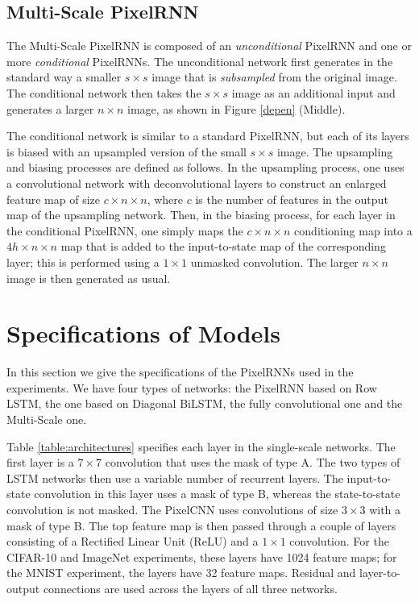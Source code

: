 \subsection{Multi-Scale PixelRNN}
\label{sect:multiscale}

The Multi-Scale PixelRNN is composed of an \emph{unconditional} PixelRNN and one or more \emph{conditional} PixelRNNs. The unconditional network first generates in the standard way a smaller $s \times s$ image that is \emph{subsampled} from the original image. The conditional network then takes the $s \times s$ image as an additional input and generates a larger $n\times n$ image, as shown in Figure \ref{depen} (Middle).

The conditional network is similar to a standard PixelRNN, but each of its layers is biased with an upsampled version of the small $s \times s$ image. The upsampling and biasing processes are defined as follows. In the upsampling process, one uses a convolutional network with deconvolutional layers to construct an enlarged feature map of size $c \times n \times n$, where $c$ is the number of features in the output map of the upsampling network. Then, in the biasing process, for each layer in the conditional PixelRNN, one simply maps the $c \times n \times n$ conditioning map into a $4h \times n \times n$ map that is added to the input-to-state map of the corresponding layer; this is performed using a $1 \times 1$ unmasked convolution. The larger $n \times n$ image is then generated as usual.


\section{Specifications of Models}

In this section we give the specifications of the PixelRNNs used in the experiments. We have four types of networks: the PixelRNN based on Row LSTM, the one based on Diagonal BiLSTM, the fully convolutional one and the Multi-Scale one. 

Table \ref{table:architectures} specifies each layer in the single-scale networks. The first layer is a $7\times7$ convolution that uses the mask of type A. The two types of LSTM networks then use a variable number of recurrent layers. The input-to-state convolution in this layer uses a mask of type B, whereas the state-to-state convolution is not masked. The PixelCNN uses convolutions of size $3\times3$ with a mask of type B. The top feature map is then passed through a couple of layers consisting of a Rectified Linear Unit (ReLU) and a $1\times1$ convolution. For the CIFAR-10 and ImageNet experiments, these layers have 1024 feature maps; for the MNIST experiment, the layers have 32 feature maps. Residual and layer-to-output connections are used across the layers of all three networks.

